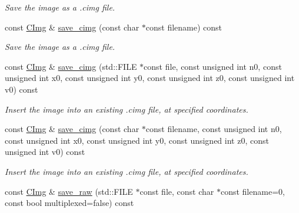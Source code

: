 \begin{DoxyCompactItemize}
\begin{DoxyCompactList}\small\item\em Save the image as a .cimg file. \end{DoxyCompactList}\item 
\hypertarget{structcimg__library_1_1_c_img_ae2b66c0e3dd50e8b7cd33f97fa4b45cf}{const \hyperlink{structcimg__library_1_1_c_img}{C\-Img} \& \hyperlink{structcimg__library_1_1_c_img_ae2b66c0e3dd50e8b7cd33f97fa4b45cf}{save\-\_\-cimg} (const char $\ast$const filename) const }\label{structcimg__library_1_1_c_img_ae2b66c0e3dd50e8b7cd33f97fa4b45cf}

\begin{DoxyCompactList}\small\item\em Save the image as a .cimg file. \end{DoxyCompactList}\item 
\hypertarget{structcimg__library_1_1_c_img_a2d538d66bb420bf6d09ec219518bc0fb}{const \hyperlink{structcimg__library_1_1_c_img}{C\-Img} \& \hyperlink{structcimg__library_1_1_c_img_a2d538d66bb420bf6d09ec219518bc0fb}{save\-\_\-cimg} (std\-::\-F\-I\-L\-E $\ast$const file, const unsigned int n0, const unsigned int x0, const unsigned int y0, const unsigned int z0, const unsigned int v0) const }\label{structcimg__library_1_1_c_img_a2d538d66bb420bf6d09ec219518bc0fb}

\begin{DoxyCompactList}\small\item\em Insert the image into an existing .cimg file, at specified coordinates. \end{DoxyCompactList}\item 
\hypertarget{structcimg__library_1_1_c_img_a2742e547afb3f4330c924d234490c868}{const \hyperlink{structcimg__library_1_1_c_img}{C\-Img} \& \hyperlink{structcimg__library_1_1_c_img_a2742e547afb3f4330c924d234490c868}{save\-\_\-cimg} (const char $\ast$const filename, const unsigned int n0, const unsigned int x0, const unsigned int y0, const unsigned int z0, const unsigned int v0) const }\label{structcimg__library_1_1_c_img_a2742e547afb3f4330c924d234490c868}

\begin{DoxyCompactList}\small\item\em Insert the image into an existing .cimg file, at specified coordinates. \end{DoxyCompactList}\item 
\hypertarget{structcimg__library_1_1_c_img_ae70ac83cf3ce759eb61133e84f2cea24}{const \hyperlink{structcimg__library_1_1_c_img}{C\-Img} \& \hyperlink{structcimg__library_1_1_c_img_ae70ac83cf3ce759eb61133e84f2cea24}{save\-\_\-raw} (std\-::\-F\-I\-L\-E $\ast$const file, const char $\ast$const filename=0, const bool multiplexed=false) const }\label{structcimg__library_1_1_c_img_ae70ac83cf3ce759eb61133e84f2cea24}


\end{DoxyCompactItemize}
